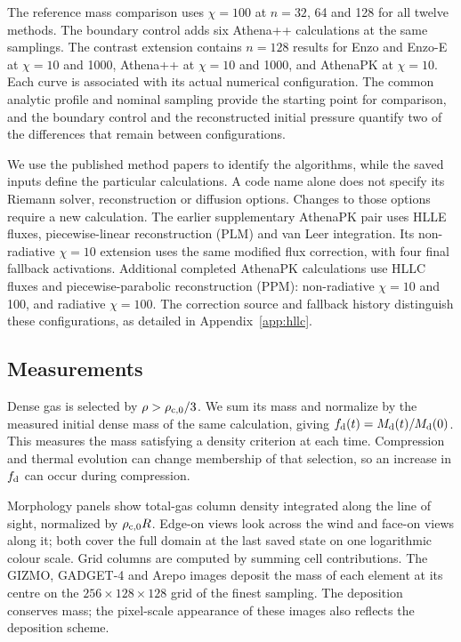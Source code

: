 \documentclass[twocolumn,apj,numberedappendix]{openjournal}
\begin{document}
The reference mass comparison uses $\chi=100$ at $n=32$, 64 and 128 for all twelve methods. The boundary control adds six Athena++ calculations at the same samplings. The contrast extension contains $n=128$ results for Enzo and Enzo-E at $\chi=10$ and 1000, Athena++ at $\chi=10$ and 1000, and AthenaPK at $\chi=10$. Each curve is associated with its actual numerical configuration. The common analytic profile and nominal sampling provide the starting point for comparison, and the boundary control and the reconstructed initial pressure quantify two of the differences that remain between configurations.

We use the published method papers to identify the algorithms, while the saved inputs define the particular calculations. A code name alone does not specify its Riemann solver, reconstruction or diffusion options. Changes to those options require a new calculation. The earlier supplementary AthenaPK pair uses HLLE fluxes, piecewise-linear reconstruction (PLM) and van Leer integration. Its non-radiative $\chi=10$ extension uses the same modified flux correction, with four final fallback activations. Additional completed AthenaPK calculations use HLLC fluxes and piecewise-parabolic reconstruction (PPM): non-radiative $\chi=10$ and 100, and radiative $\chi=100$. The correction source and fallback history distinguish these configurations, as detailed in Appendix~\ref{app:hllc}.

\subsection{Measurements}\label{sec:measurements}
Dense gas is selected by $\rho>\rho_{\rm c,0}/3$. We sum its mass and normalize by the measured initial dense mass of the same calculation, giving $f_{\rm d}(t)=M_{\rm d}(t)/M_{\rm d}(0)$. This measures the mass satisfying a density criterion at each time. Compression and thermal evolution can change membership of that selection, so an increase in $f_{\rm d}$ can occur during compression.

Morphology panels show total-gas column density integrated along the line of sight, normalized by $\rho_{\rm c,0}R$. Edge-on views look across the wind and face-on views along it; both cover the full domain at the last saved state on one logarithmic colour scale. Grid columns are computed by summing cell contributions. The GIZMO, GADGET-4 and Arepo images deposit the mass of each element at its centre on the $256\times128\times128$ grid of the finest sampling. The deposition conserves mass; the pixel-scale appearance of these images also reflects the deposition scheme.
\end{document}
